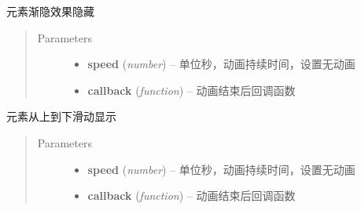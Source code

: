 \documentclass[letterpaper,10pt,english]{sphinxmanual}
\begin{document}
\begin{fulllineitems}
\label{api/core/anim/index:Anim.Node.fadeOut}
元素渐隐效果隐藏
\begin{quote}\begin{description}
\item[{Parameters}] \leavevmode\begin{itemize}
\item {}
\textbf{speed} (\emph{number}) -- 单位秒，动画持续时间，设置无动画

\item {}
\textbf{callback} (\emph{function}) -- 动画结束后回调函数

\end{itemize}

\end{description}\end{quote}

\end{fulllineitems}



\begin{fulllineitems}
\label{api/core/anim/index:Anim.Node.slideDown}
元素从上到下滑动显示
\begin{quote}\begin{description}
\item[{Parameters}] \leavevmode\begin{itemize}
\item {}
\textbf{speed} (\emph{number}) -- 单位秒，动画持续时间，设置无动画

\item {}
\textbf{callback} (\emph{function}) -- 动画结束后回调函数

\end{itemize}

\end{description}\end{quote}

\end{fulllineitems}


\end{document}
